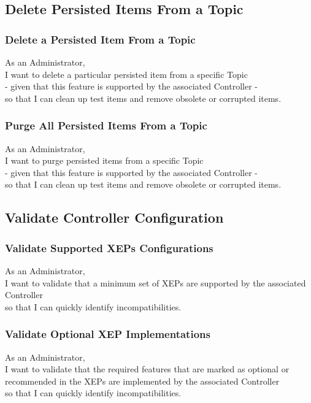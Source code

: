 \subsection{Delete Persisted Items From a Topic}

\subsubsection{Delete a Persisted Item From a Topic}

As an Administrator,\\
I want to delete a particular persisted item from a specific Topic\\
- given that this feature is supported by the associated Controller -\\
so that I can clean up test items and remove obsolete or corrupted items.

\subsubsection{Purge All Persisted Items From a Topic}

As an Administrator,\\
I want to purge persisted items from a specific Topic\\
- given that this feature is supported by the associated Controller -\\
so that I can clean up test items and remove obsolete or corrupted items.

\subsection{Validate Controller Configuration}

\subsubsection{Validate Supported XEPs Configurations}
As an Administrator,\\
I want to validate that a minimum set of XEPs are supported by the associated Controller\\
so that I can quickly identify incompatibilities.

\subsubsection{Validate Optional XEP Implementations}
As an Administrator,\\
I want to validate that the required features that are marked as optional or recommended in the XEPs are implemented by the associated Controller\\
so that I can quickly identify incompatibilities.

